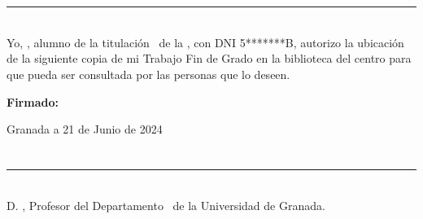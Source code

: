 
\chapter*{}

\thispagestyle{empty}

\noindent\rule[-2ex]{\textwidth}{1.5pt}\\[3.5ex]

Yo, \textbf{\myName}, alumno de la titulación \myDegree\ de la \textbf{\myFaculty}, con DNI 5*******B, autorizo la
ubicación de la siguiente copia de mi Trabajo Fin de Grado en la biblioteca del centro para que pueda ser
consultada por las personas que lo deseen.

\vspace{6cm}

\noindent \textbf{Firmado:} \myName

\vspace{2cm}

\begin{flushright}
    Granada a 21 de Junio de 2024
\end{flushright}


\chapter*{}

\thispagestyle{empty}

\noindent\rule[-2ex]{\textwidth}{1.5pt}\\[3.5ex]

D. \textbf{\myProf}, Profesor del Departamento \myDepartmentAlt\ de la Universidad de Granada.

\vspace{0.5cm}



